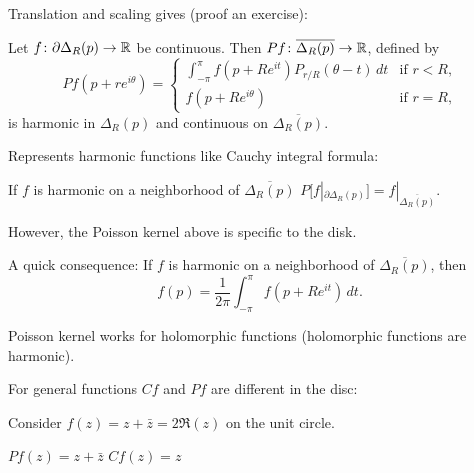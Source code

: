 \documentclass[10pt,aspectratio=169]{beamer}
\begin{document}
\begin{frame}
Translation and scaling gives (proof an exercise):

\begin{corollary} \label{cor:dirichsol}
Let $f \colon \partial \Delta_R(p) \to {\mathbb{R}}$ be continuous.
Then
$Pf \colon \overline{\Delta_R(p)} \to {\mathbb{R}}$, defined by
\begin{equation*}
Pf(p + re^{i\theta})
=
\begin{cases}
\int_{-\pi}^\pi f(p+Re^{it}) P_{r/R}(\theta-t) \, dt
&
\text{if $r < R$,} \\
f(p+Re^{i\theta}) & \text{if $r=R$,}
\end{cases}
\end{equation*}
is harmonic in $\Delta_R(p)$ and continuous on $\overline{\Delta_R(p)}$.
\end{corollary}
\pause

Represents harmonic functions like Cauchy integral formula:

\medskip

If $f$ is harmonic on a neighborhood of $\overline{\Delta_R(p)}$
\wthus
$P[f|_{\partial \Delta_R(p)}] = f|_{\overline{\Delta_R(p)}}$.

\medskip
\pause

However, the Poisson kernel above is specific to the disk.

\medskip
\pause

A quick consequence: 
If $f$ is harmonic on a neighborhood of $\overline{\Delta_R(p)}$,
then
\[
f(p) = \frac{1}{2\pi} \int_{-\pi}^{\pi}f(p + R e^{it}) \, dt .
\]
\end{frame}

\begin{frame}
Poisson kernel works for holomorphic functions
(holomorphic functions are harmonic).

\medskip
\pause

For general functions
$Cf$ and $Pf$ are different in the disc:

\medskip

Consider $f(z) = z+\bar{z} = 2\Re(z)$ on the unit circle.

\medskip

$Pf(z) = z+\bar{z}$ \qquad $Cf(z) = z$


\end{frame}
\end{document}
